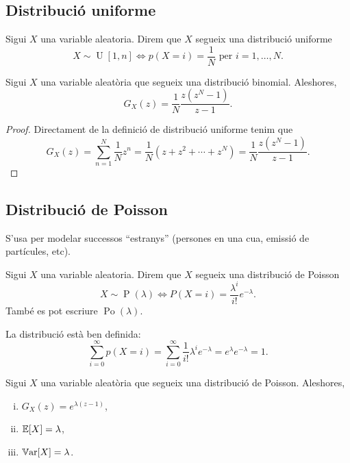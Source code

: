 \subsection*{Distribució uniforme}

\begin{defi}
    Sigui $X$ una variable aleatoria. Direm que $X$ segueix una distribució uniforme
    \[X \sim \operatorname{U}[1,n] \iff p(X=i)=\frac{1}{N} \text{ per } i = 1,\dots,N.\]
\end{defi}

\begin{prop}
    Sigui $X$ una variable aleatòria que segueix una distribució binomial. Aleshores,
    \[ G_X(z) =  \frac{1}{N}\frac{z(z^N-1)}{z-1}.\]
\end{prop}

\begin{proof}
  Directament de la definició de distribució uniforme tenim que
  \[G_X(z) = \sum_{n=1}^N \frac{1}{N}z^n = \frac{1}{N}(z+z^2+\cdots+z^N) = \frac{1}{N}\frac{z(z^N-1)}{z-1}.\]
\end{proof}


\subsection*{Distribució de Poisson}

S'usa per modelar successos ``estranys'' (persones en una cua, emissió de partícules, etc).

\begin{defi}
    Sigui $X$ una variable aleatoria. Direm que $X$ segueix una distribució de Poisson
    \[X \sim \operatorname{P}(\lambda) \iff P(X=i) = \frac{\lambda^i }{i!}e^{-\lambda}.\]
    També es pot escriure $\operatorname{Po}(\lambda)$.
\end{defi}

\begin{obs}
    La distribució està ben definida:
    \[\sum_{i=0}^\infty p(X=i) = \sum_{i=0}^\infty \frac{1}{i!}\lambda^i e^{-\lambda} = e^\lambda e^{-\lambda} = 1.\]
\end{obs}

\begin{prop}
    Sigui $X$ una variable aleatòria que segueix una distribució de Poisson. Aleshores,
    \begin{enumerate}[i)]
        \item $G_X(z) = e^{\lambda(z-1)}$,
        \item $\operatorname{\mathbb{E}}[X] = \lambda$,
        \item $\operatorname{\mathbb{V}ar}[X] = \lambda$.
    \end{enumerate}
\end{prop}

